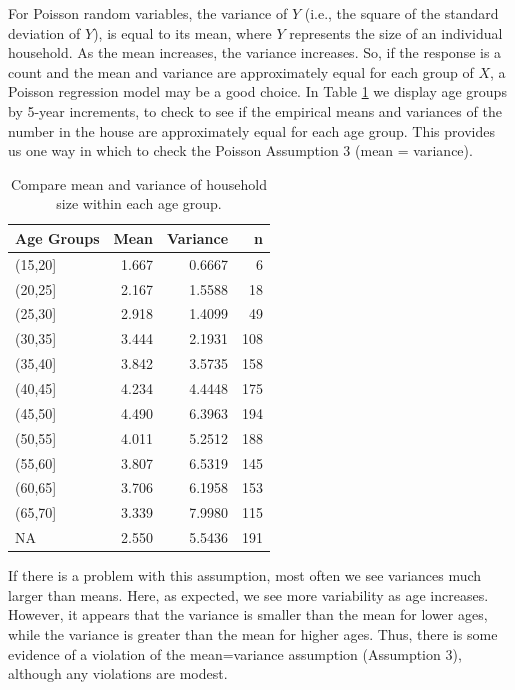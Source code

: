 \documentclass[
]{krantz}
\begin{document}
For Poisson random variables, the variance of \(Y\) (i.e., the square of the standard deviation of \(Y\)), is equal to its mean, where \(Y\) represents the size of an individual household. As the mean increases, the variance increases. So, if the response is a count and the mean and variance are approximately equal for each group of \(X\), a Poisson regression model may be a good choice. In Table \ref{tab:table1chp4} we display age groups by 5-year increments, to check to see if the empirical means and variances of the number in the house are approximately equal for each age group. This provides us one way in which to check the Poisson Assumption 3 (mean = variance).

\begin{table}
\centering
\caption{\label{tab:table1chp4}Compare mean and variance of household size within each age group.}
\centering
\begin{tabular}[t]{lrrr}
\toprule
Age Groups & Mean & Variance & n\\
\midrule
(15,20] & 1.667 & 0.6667 & 6\\
(20,25] & 2.167 & 1.5588 & 18\\
(25,30] & 2.918 & 1.4099 & 49\\
(30,35] & 3.444 & 2.1931 & 108\\
(35,40] & 3.842 & 3.5735 & 158\\
\addlinespace
(40,45] & 4.234 & 4.4448 & 175\\
(45,50] & 4.490 & 6.3963 & 194\\
(50,55] & 4.011 & 5.2512 & 188\\
(55,60] & 3.807 & 6.5319 & 145\\
(60,65] & 3.706 & 6.1958 & 153\\
\addlinespace
(65,70] & 3.339 & 7.9980 & 115\\
NA & 2.550 & 5.5436 & 191\\
\bottomrule
\end{tabular}
\end{table}

If there is a problem with this assumption, most often we see variances much larger than means. Here, as expected, we see more variability as age increases. However, it appears that the variance is smaller than the mean for lower ages, while the variance is greater than the mean for higher ages. Thus, there is some evidence of a violation of the mean=variance assumption (Assumption 3), although any violations are modest.
\end{document}

